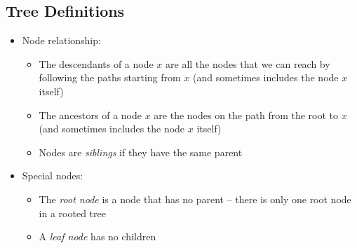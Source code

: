 \documentclass[10pt]{article}
\begin{document}
\subsection*{Tree Definitions}
\begin{itemize}
    \item Node relationship:
    \begin{itemize}
        \item The descendants of a node $x$ are all the nodes that we can reach by following the paths starting from $x$ (and sometimes includes the node $x$ itself)
        \item The ancestors of a node $x$ are the nodes on the path from the root to $x$ (and sometimes includes the node $x$ itself)
        \item Nodes are \textit{siblings} if they have the same parent
    \end{itemize}
    \item Special nodes:
    \begin{itemize}
        \item The \textit{root node} is a node that has no parent -- there is only one root node in a rooted tree
        \item A \textit{leaf node} has no children
    \end{itemize}
\end{itemize}
\end{document}
